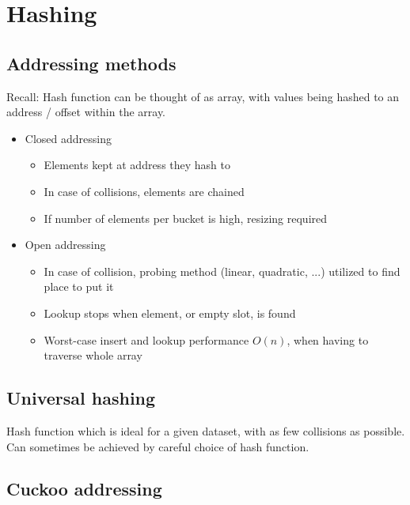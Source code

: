 \documentclass[a4paper]{scrreprt}
\begin{document}
\chapter{Hashing}

\section{Addressing methods}

Recall: Hash function can be thought of as array, with values being hashed to
an address / offset within the array.

\begin{itemize}
		\item Closed addressing
				\begin{itemize}
						\item Elements kept at address they hash to
						\item In case of collisions, elements are chained
						\item If number of elements per bucket is high, resizing required
				\end{itemize}
		\item Open addressing
				\begin{itemize}
						\item In case of collision, probing method (linear,
								quadratic, ...) utilized to find place to put
								it
						\item Lookup stops when element, or empty slot, is
								found
						\item Worst-case insert and lookup performance $O(n)$,
								when having to traverse whole array
				\end{itemize}
\end{itemize}

\section{Universal hashing}

Hash function which is ideal for a given dataset, with as few collisions as
possible. Can sometimes be achieved by careful choice of hash function.

\section{Cuckoo addressing}
\end{document}
